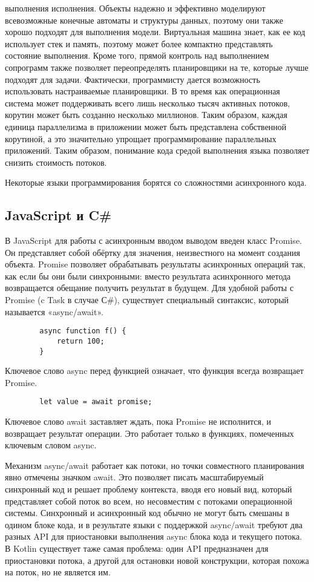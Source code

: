 	выполнения исполнения. Объекты надежно и эффективно моделируют всевозможные конечные автоматы и структуры данных, поэтому
	они также хорошо подходят для выполнения модели. Виртуальная машина знает, как ее код использует стек и память, поэтому может более компактно представлять состояние выполнения.
	Кроме того, прямой контроль над выполнением сопрограмм также позволяет переопределять планировщики на те, которые
	лучше подходят для задачи. Фактически, программисту дается возможность использовать настраиваемые планировщики. 
	В то время как операционная система может поддерживать всего лишь несколько тысяч активных потоков, корутин может быть
	созданно несколько миллионов. Таким образом, каждая единица параллелизма в приложении может быть представлена ​​собственной 
	корутиной, а это значительно упрощает программирование параллельных приложений. Таким
	образом, понимание кода средой выполнения языка позволяет снизить стоимость потоков.
	
	Некоторые языки программирования борятся со сложностями асинхронного кода.
	
	\subsection{JavaScript и C\#}
	В JavaScript для работы с асинхронным вводом выводом введен класс Promise.
	Он представляет собой обёртку для значения, неизвестного на момент создания объекта. 
	Promise позволяет обрабатывать результаты асинхронных операций так, как если бы они были синхронными:
	вместо результата асинхронного метода возвращается обещание получить результат в будущем.
	Для удобной работы с Promise (c Task в случае С\#), существует специальный синтаксис, который называется «async/await».
	
	\begin{lstlisting}
		async function f() {
			return 100;
		}
	\end{lstlisting}

	Ключевое слово async перед функцией означает, что функция всегда возвращает Promise.
	
	\begin{lstlisting}
		let value = await promise;
	\end{lstlisting}
	Ключевое слово await заставляет ждать, пока Promise не исполнится, и возвращает результат операции. Это работает только в функциях, помеченных ключевым словом async. 
	
	Механизм async/await работает как потоки, но точки совместного планирования явно отмечены значком
	await. Это позволяет писать масштабируемый синхронный код и решает проблему контекста, вводя
	его	новый вид, который представляет собой поток во всем, но несовместим с потоками операционной
	системы. Синхронный и асинхронный код обычно не могут быть смешаны в одином блоке кода, и в
	результате языки с поддержкой async/await требуют два разных API для приостановки выполнения async
	блока кода и текущего потока. В Kotlin существует таже самая проблема: один API предназначен для
	приостановки потока, а другой для остановки новой конструкции, которая похожа на поток, но не
	является им.
	
